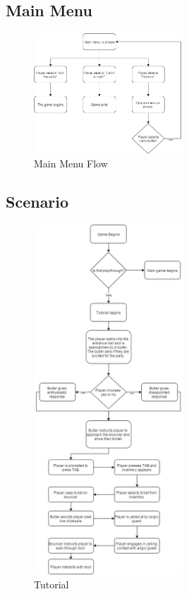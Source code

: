 \subsection{Main Menu}
\begin{figure}[H]
\centering\includegraphics[width=0.5\textwidth, height=0.8\paperheight, keepaspectratio=true]{images/MainMenu}
  \caption{Main Menu Flow}
  \label{fig:flow_scenario}
\end{figure}

\clearpage

\subsection{Scenario}
\begin{figure}[H]
\centering\includegraphics[width=0.5\textwidth, height=0.8\paperheight, keepaspectratio=true]{images/Tutorial}
  \caption{Tutorial}
  \label{fig:flow_tutorial}
\end{figure}

